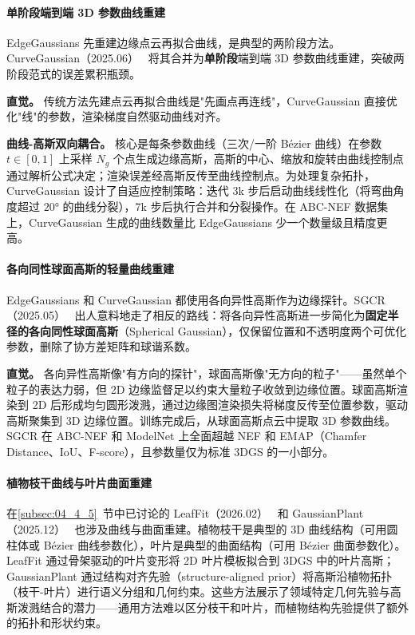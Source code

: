 \paragraph{单阶段端到端 3D 参数曲线重建}

EdgeGaussians 先重建边缘点云再拟合曲线，是典型的两阶段方法。CurveGaussian（2025.06）~\cite{2506_21401} 将其合并为\textbf{单阶段}端到端 3D 参数曲线重建，突破两阶段范式的误差累积瓶颈。

\textbf{直觉。} 传统方法先建点云再拟合曲线是"先画点再连线"，CurveGaussian 直接优化"线"的参数，渲染梯度自然驱动曲线对齐。

\textbf{曲线-高斯双向耦合。} 核心是每条参数曲线（三次/一阶 B\'{e}zier 曲线）在参数 $t \in [0,1]$ 上采样 $N_g$ 个点生成边缘高斯，高斯的中心、缩放和旋转由曲线控制点通过解析公式决定；渲染误差经高斯反传至曲线控制点。为处理复杂拓扑，CurveGaussian 设计了自适应控制策略：迭代 3k 步后启动曲线线性化（将弯曲角度超过 $20°$ 的曲线分裂），7k 步后执行合并和分裂操作。在 ABC-NEF 数据集上，CurveGaussian 生成的曲线数量比 EdgeGaussians 少一个数量级且精度更高。

\paragraph{各向同性球面高斯的轻量曲线重建}

EdgeGaussians 和 CurveGaussian 都使用各向异性高斯作为边缘探针。SGCR（2025.05）~\cite{2505_04668} 出人意料地走了相反的路线：将各向异性高斯进一步简化为\textbf{固定半径的各向同性球面高斯}（Spherical Gaussian），仅保留位置和不透明度两个可优化参数，删除了协方差矩阵和球谐系数。

\textbf{直觉。} 各向异性高斯像"有方向的探针"，球面高斯像"无方向的粒子"——虽然单个粒子的表达力弱，但 2D 边缘监督足以约束大量粒子收敛到边缘位置。球面高斯渲染到 2D 后形成均匀圆形泼溅，通过边缘图渲染损失将梯度反传至位置参数，驱动高斯聚集到 3D 边缘位置。训练完成后，从球面高斯点云中提取 3D 参数曲线。SGCR 在 ABC-NEF 和 ModelNet 上全面超越 NEF 和 EMAP（Chamfer Distance、IoU、F-score），且参数量仅为标准 3DGS 的一小部分。

\paragraph{植物枝干曲线与叶片曲面重建}

在\ref{subsec:04_4_5}~节中已讨论的 LeafFit（2026.02）~\cite{2602_11577} 和 GaussianPlant（2025.12）~\cite{2512_14087} 也涉及曲线与曲面重建。植物枝干是典型的 3D 曲线结构（可用圆柱体或 B\'{e}zier 曲线参数化），叶片是典型的曲面结构（可用 B\'{e}zier 曲面参数化）。LeafFit 通过骨架驱动的叶片变形将 2D 叶片模板拟合到 3DGS 中的叶片高斯；GaussianPlant 通过结构对齐先验（structure-aligned prior）将高斯沿植物拓扑（枝干-叶片）进行语义分组和几何约束。这些方法展示了领域特定几何先验与高斯泼溅结合的潜力——通用方法难以区分枝干和叶片，而植物结构先验提供了额外的拓扑和形状约束。

